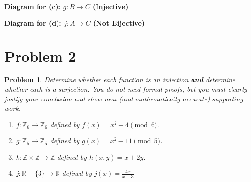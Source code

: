 \documentclass[12pt]{article}
\newtheorem{problem}{Problem}
\theoremstyle{definition}
\begin{document}
\begin{center}
\textbf{Diagram for (c): $g : B \to C$ (Injective)}
\newline
\newline
{}
\end{center}

\begin{center}
\textbf{Diagram for (d): $j : A \to C$ (Not Bijective)}
\newline
\newline
{}
\end{center}

\newpage

\section*{Problem 2}

\begin{problem}
Determine whether each function is an injection \textbf{and} determine whether each is a surjection. You do not need formal proofs, but you must clearly justify your conclusion and show neat (and mathematically accurate) supporting work.

\begin{enumerate}[label=(\alph*)]
    \item $f : \mathbb{Z}_6 \to \mathbb{Z}_6$ defined by $f(x) = x^2 + 4 \pmod{6}$.
    \item $g : \mathbb{Z}_5 \to \mathbb{Z}_5$ defined by $g(x) = x^2 - 11 \pmod{5}$.
    \item $h : \mathbb{Z} \times \mathbb{Z} \to \mathbb{Z}$ defined by $h(x, y) = x + 2y$.
    \item $j : \mathbb{R} - \{3\} \to \mathbb{R}$ defined by $j(x) = \frac{4x}{x - 3}$.
\end{enumerate}
\end{problem}
\end{document}
